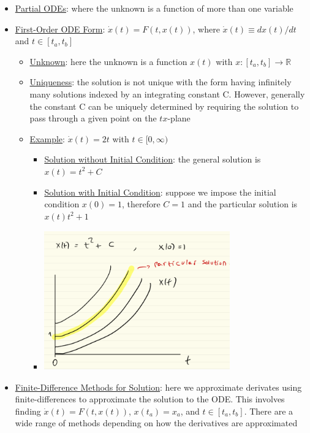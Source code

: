\documentclass{article}
\begin{document}
\begin{itemize}
    \item \underline{Partial ODEs}: where the unknown is a function of more than one variable
    \item  \underline{First-Order ODE Form}: $\dot{x}(t) = F(t, x(t))$, where $\dot{x}(t) \equiv dx(t)/dt$ and $t \in [t_{a}, t_{b}]$
    \begin{itemize}
        \item \underline{Unknown}: here the unknown is a function $x(t)$ with $x: [t_{a}, t_{b}] \rightarrow \mathbb{R}$
        \item  \underline{Uniqueness}: the solution is not unique with the form having infinitely many solutions indexed by an integrating constant C. However, generally the constant C can be uniquely determined by requiring the solution to pass through a given point on the $tx$-plane
        \item  \underline{Example}: $\dot{x}(t) = 2t$ with $t \in [0,\infty)$
        \begin{itemize}
            \item \underline{Solution without Initial Condition}: the general solution is $x(t) = t^{2} + C$
            \item  \underline{Solution with Initial Condition}: suppose we impose the initial condition $x(0) = 1$, therefore $C=1$ and the particular solution is $x(t) t^{2} + 1$
            \item \includegraphics[width=8cm, height=6cm]{pic5}
        \end{itemize}
    \end{itemize}
    \item  \underline{Finite-Difference Methods for Solution}: here we approximate derivates using finite-differences to approximate the solution to the ODE. This involves finding $\dot{x}(t) = F(t,x(t))$, $x(t_{a}) = x_{a}$, and $t \in [t_{a}, t_{b}]$. There are a wide range of methods depending on how the derivatives are approximated

\end{itemize}
\end{document}
